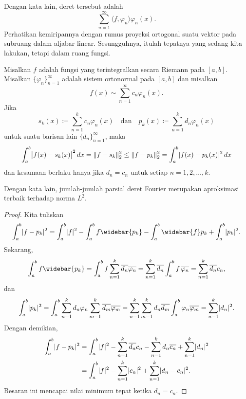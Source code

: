 Dengan kata lain, deret tersebut adalah
\begin{equation*}
\sum_{n=1}^\infty \langle f , \varphi_n \rangle \varphi_n(x) .
\end{equation*}
Perhatikan kemiripannya dengan rumus proyeksi ortogonal
suatu vektor pada subruang dalam aljabar linear. Sesungguhnya,
itulah tepatnya yang sedang kita lakukan, tetapi dalam ruang fungsi.

\begin{thm} \label{thm:l2bestapprox}
Misalkan $f$ adalah fungsi yang terintegralkan secara Riemann pada $[a,b]$.
Misalkan $\{ \varphi_n \}_{n=1}^\infty$ adalah sistem ortonormal pada $[a,b]$ dan
misalkan
\begin{equation*}
f(x) \sim \sum_{n=1}^\infty c_n \varphi_n(x) .
\end{equation*}
Jika
\begin{equation*}
s_k (x) \coloneqq \sum_{n=1}^k c_n \varphi_n(x)
\quad\text{dan}\quad
p_k (x) \coloneqq \sum_{n=1}^k d_n \varphi_n(x)
\end{equation*}
untuk suatu barisan lain $\{ d_n \}_{n=1}^\infty$, maka
\begin{equation*}
\int_a^b \bigl\lvert {f(x)-s_k(x)} \bigr\rvert^2 \, dx = \lVert {f-s_k} \rVert_2^2 \leq
\lVert {f-p_k} \rVert_2^2 = \int_a^b \lvert {f(x)-p_k(x)} \rvert^2 \, dx
\end{equation*}
dan kesamaan berlaku hanya jika $d_n = c_n$ untuk setiap $n=1,2,\ldots,k$.
\end{thm}

Dengan kata lain, jumlah-jumlah parsial deret Fourier merupakan aproksimasi terbaik terhadap
norma $L^2$.

\begin{proof}
Kita tuliskan
\begin{equation*}
\int_a^b \sabs{f-p_k}^2
=
\int_a^b \sabs{f}^2
-
\int_a^b f \widebar{p_k}
-
\int_a^b \widebar{f} p_k
+
\int_a^b \sabs{p_k}^2 .
\end{equation*}
Sekarang,
\begin{equation*}
\int_a^b f \widebar{p_k}
=
\int_a^b f \sum_{n=1}^k \overline{d_n} \overline{\varphi_n}
=
 \sum_{n=1}^k \overline{d_n} \int_a^b f \, \overline{\varphi_n}
=
 \sum_{n=1}^k \overline{d_n} c_n ,
\end{equation*}
dan
\begin{equation*}
\int_a^b \lvert {p_k} \rvert^2
=
\int_a^b
\sum_{n=1}^k d_n \varphi_n
\sum_{m=1}^k \overline{d_m} \overline{\varphi_m}
=
\sum_{n=1}^k
\sum_{m=1}^k 
d_n
\overline{d_m} 
\int_a^b
\varphi_n
\overline{\varphi_m}
=
\sum_{n=1}^k
\lvert {d_n} \rvert^2 .
\end{equation*}
Dengan demikian,
\begin{equation*}
\begin{split}
\int_a^b \lvert {f-p_k} \rvert^2
& =
\int_a^b \lvert {f} \rvert^2
-
\sum_{n=1}^k \overline{d_n} c_n
-
\sum_{n=1}^k d_n \overline{c_n}
+
\sum_{n=1}^k
\lvert {d_n} \rvert^2
\\
& =
\int_a^b \lvert {f} \rvert^2
-
\sum_{n=1}^k \lvert {c_n} \rvert^2
+
\sum_{n=1}^k
\lvert {d_n-c_n} \rvert^2 .
\end{split}
\end{equation*}
Besaran ini mencapai nilai minimum tepat ketika $d_n = c_n$.
\end{proof}

